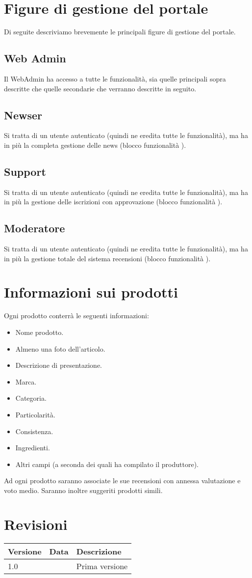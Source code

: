 \section{Figure di gestione del portale}
Di seguite descriviamo brevemente le principali figure di gestione del portale.

\subsection{Web Admin}
Il WebAdmin ha accesso a tutte le funzionalità, sia quelle principali sopra descritte che quelle secondarie che verranno descritte in seguito.

\subsection{Newser}
Si tratta di un utente autenticato (quindi ne eredita tutte le funzionalità), ma ha in più la completa gestione delle news (blocco funzionalità ).

\subsection{Support}
Si tratta di un utente autenticato (quindi ne eredita tutte le funzionalità), ma ha in più la gestione delle iscrizioni con approvazione (blocco funzionalità ).

\subsection{Moderatore}
Si tratta di un utente autenticato (quindi ne eredita tutte le funzionalità), ma ha in più la gestione totale del sistema recensioni (blocco funzionalità ).

\section{Informazioni sui prodotti}
Ogni prodotto conterrà le seguenti informazioni:
\begin{itemize}[noitemsep]
	\item Nome prodotto. 
	\item Almeno una foto dell’articolo.
	\item  Descrizione di presentazione.
	\item  Marca.
	\item Categoria.
	\item Particolarità.
	\item Consistenza.
	\item Ingredienti.
	\item Altri campi (a seconda dei quali ha compilato il produttore).
\end{itemize}
Ad ogni prodotto saranno associate le sue recensioni con annessa valutazione e voto medio. Saranno inoltre suggeriti prodotti simili.

\section{Revisioni}
\begin{center}
	\begin{tabular}{lll}
		\toprule
		Versione & Data & Descrizione \\
		\midrule
		1.0 & \displaydate{versioneuno} & Prima versione \\
		\bottomrule
	\end{tabular}
\end{center}
